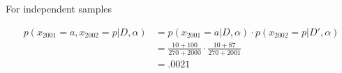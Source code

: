 \documentclass{article}
\begin{document}
For independent samples

\begin{align*}
  p(x_{2001}=a, x_{2002}=p|D,\alpha) &= p(x_{2001}=a|D,\alpha)
                                           \cdot
                                           p(x_{2002}=p|D',\alpha)
  \\
                                         &= \frac{10 + 100}{270 +
                                           2000} \cdot \frac{10 +
                                           87}{270 + 2001} \\
                                         &= .0021
\end{align*}
\end{document}
